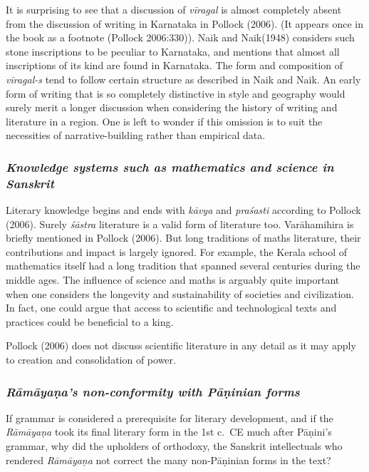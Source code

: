 It is surprising to see that a discussion of {\sl vīragal} is almost completely absent from the discussion of writing in Karnataka in Pollock (2006). (It appears once in the book as a footnote (Pollock 2006:330)). Naik and Naik(1948) considers such stone inscriptions to be peculiar to Karnataka, and mentions that almost all inscriptions of its kind are found in Karnataka. The form and composition of {\sl vīragal-s} tend to follow certain structure as described in Naik and Naik. An early form of writing that is so completely distinctive in style and geography would surely merit a longer discussion when considering the history of writing and literature in a region. One is left to wonder if this omission is to suit the necessities of narrative-building rather than empirical data. 
\vskip -10pt

\subsubsection{{\sl Knowledge systems such as mathematics and science in Sanskrit}}
\vskip -4pt

Literary knowledge begins and ends with {\sl kāvya} and {\sl praśasti} according to Pollock (2006). Surely {\sl śāstra} literature is a valid form of literature too. Varāha\-mihira is briefly mentioned in Pollock (2006). But long traditions of maths literature, their contributions and impact is largely ignored. For example, the Kerala school of mathematics itself had a long tradition that spanned several centuries during the middle ages. The influence of science and maths is arguably quite important when one considers the longevity and sustainability of societies and civilization. In fact, one could argue that access to scientific and technological texts and practices could be beneficial to a king. 

Pollock (2006) does not discuss scientific literature in any detail as it may apply to creation and consolidation of power. 

\subsubsection{{\sl Rāmāyaṇa’s non-conformity with Pāṇinian forms}}

If grammar is considered a prerequisite for literary development, and if the {\sl Rāmāyaṇa} took its final literary form in the 1st c.\ CE much after Pāṇini’s grammar, why did the upholders of orthodoxy, the Sanskrit intellectuals who rendered {\sl Rāmāyaṇa} not correct the many non-Pāṇinian forms in the text? 

